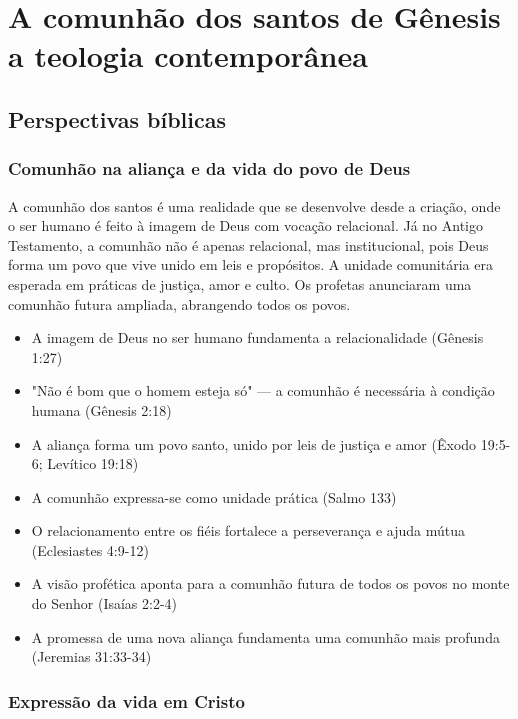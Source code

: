 \newpage

\section{A comunhão dos santos de Gênesis a teologia contemporânea}

\subsection{Perspectivas bíblicas}

\subsubsection{Comunhão na aliança e da vida do povo de Deus}
A comunhão dos santos é uma realidade que se desenvolve desde a criação, onde o ser humano é feito à imagem de Deus com vocação relacional. Já no Antigo Testamento, a comunhão não é apenas relacional, mas institucional, pois Deus forma um povo que vive unido em leis e propósitos. A unidade comunitária era esperada em práticas de justiça, amor e culto. Os profetas anunciaram uma comunhão futura ampliada, abrangendo todos os povos.

\begin{itemize}
\item A imagem de Deus no ser humano fundamenta a relacionalidade (Gênesis 1:27)
\item "Não é bom que o homem esteja só" — a comunhão é necessária à condição humana (Gênesis 2:18)
\item A aliança forma um povo santo, unido por leis de justiça e amor (Êxodo 19:5-6; Levítico 19:18)
\item A comunhão expressa-se como unidade prática (Salmo 133)
\item O relacionamento entre os fiéis fortalece a perseverança e ajuda mútua (Eclesiastes 4:9-12)
\item A visão profética aponta para a comunhão futura de todos os povos no monte do Senhor (Isaías 2:2-4)
\item A promessa de uma nova aliança fundamenta uma comunhão mais profunda (Jeremias 31:33-34)
\end{itemize}

\subsubsection{Expressão da vida em Cristo}

